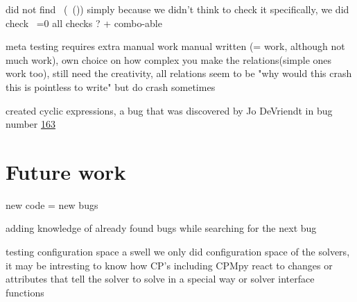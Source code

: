 did not find ~(~()) simply because we didn't think to check it specifically, we did check ~=0
all checks ? + combo-able

meta testing requires extra manual work
manual written (= work, although not much work), own choice on how complex you make the relations(simple ones work too), still need the creativity, all relations seem to be "why would this crash this is pointless to write" but do crash sometimes

created cyclic expressions, a bug that was discovered by Jo DeVriendt in bug number \href{www.todo.be}{163}

\section{Future work}
\label{con:FutureWork}

new code = new bugs

adding knowledge of already found bugs while searching for the next bug


testing configuration space a swell \cite{42FalconFuzzingConfigurationSettingsAndNormal}
we only did configuration space of the solvers, it may be intresting to know how CP's including CPMpy react to changes or attributes that tell the solver to solve in a special way 
or solver interface functions 




